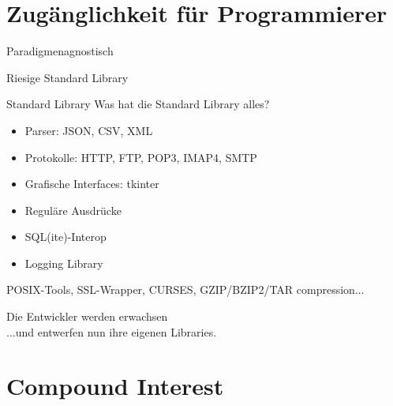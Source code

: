 \documentclass{beamer}
\begin{document}
\section{Zug\"anglichkeit f\"ur Programmierer}

\begin{frame}
\begin{center}
\Huge Paradigmenagnostisch
\end{center}
\end{frame}

\begin{frame}
\begin{center}
\Huge Riesige Standard Library
\end{center}
\end{frame}

\begin{frame}{Standard Library}
Was hat die Standard Library alles?
\pause
\begin{itemize}
\item Parser: JSON, CSV, XML
\pause
\item Protokolle: HTTP, FTP, POP3, IMAP4, SMTP
\pause
\item Grafische Interfaces: tkinter
\pause
\item Regul\"are Ausdr\"ucke
\pause
\item SQL(ite)-Interop
\pause
\item Logging Library
\pause
\end{itemize}
POSIX-Tools, SSL-Wrapper, CURSES, GZIP/BZIP2/TAR compression...
\end{frame}

\begin{frame}
\begin{center}
{ \Huge Die Entwickler werden erwachsen}\\
...und entwerfen nun ihre eigenen Libraries.
\end{center}
\end{frame}

\section{Compound Interest}
\end{document}
